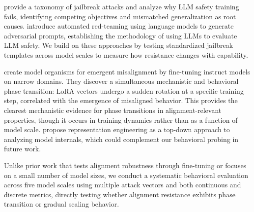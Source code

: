 \citet{wei2024jailbroken} provide a taxonomy of jailbreak attacks and analyze why LLM safety training fails, identifying competing objectives and mismatched generalization as root causes. \citet{perez2022red} introduce automated red-teaming using language models to generate adversarial prompts, establishing the methodology of using LLMs to evaluate LLM safety. We build on these approaches by testing standardized jailbreak templates across model scales to measure how resistance changes with capability.

\citet{turner2025model} create model organisms for emergent misalignment by fine-tuning instruct models on narrow domains. They discover a simultaneous mechanistic and behavioral phase transition: LoRA vectors undergo a sudden rotation at a specific training step, correlated with the emergence of misaligned behavior. This provides the clearest mechanistic evidence for phase transitions in alignment-relevant properties, though it occurs in training dynamics rather than as a function of model scale. \citet{zou2023representation} propose representation engineering as a top-down approach to analyzing model internals, which could complement our behavioral probing in future work.

Unlike prior work that tests alignment robustness through fine-tuning or focuses on a small number of model sizes, we conduct a systematic behavioral evaluation across five model scales using multiple attack vectors and both continuous and discrete metrics, directly testing whether alignment resistance exhibits phase transition or gradual scaling behavior.

